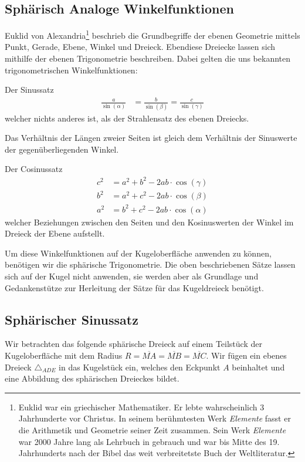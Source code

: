 \begin{refsection}
\section{Sphärisch Analoge Winkelfunktionen}
Euklid von Alexandria\footnote{%
Euklid war ein griechischer Mathematiker. Er lebte wahrscheinlich 3 Jahrhunderte vor Christus. In seinem berühmtesten Werk \textit{Elemente} fasst er die Arithmetik und Geometrie seiner Zeit zusammen. Sein Werk \textit{Elemente} war 2000 Jahre lang als Lehrbuch in gebrauch und war bis Mitte des 19. Jahrhunderts nach der Bibel das weit verbreitetste Buch der Weltliteratur.}  beschrieb die Grundbegriffe der ebenen Geometrie mittels Punkt, Gerade, Ebene, Winkel und Dreieck. Ebendiese Dreiecke lassen sich mithilfe der ebenen Trigonometrie beschreiben. Dabei gelten die uns bekannten trigonometrischen Winkelfunktionen:

Der Sinussatz
\begin{align*}
\frac{ a }{\sin(\alpha) } &= \frac{ b }{\sin(\beta)} = \frac{ c }{\sin(\gamma)}
\end{align*}
welcher nichts anderes ist, als der Strahlensatz des ebenen Dreiecks. 

\begin{definition}
Das Verhältnis der Längen zweier Seiten ist gleich dem Verhältnis der Sinuswerte der gegenüberliegenden Winkel.
\end{definition}

Der Cosinussatz
\begin{align*}
c^{ 2 } &= a^{ 2 } + b^{ 2 } - 2ab\cdot \cos(\gamma)\\
b^{ 2 } &= a^{ 2 } + c^{ 2 } - 2ab\cdot \cos(\beta)\\
a^{ 2 } &= b^{ 2 } + c^{ 2 } - 2ab\cdot \cos(\alpha)
\end{align*}
welcher Beziehungen zwischen den Seiten und den Kosinuswerten der Winkel im Dreieck der Ebene aufstellt.

Um diese Winkelfunktionen auf der Kugeloberfläche anwenden zu können, benötigen wir die sphärische Trigonometrie. Die oben beschriebenen Sätze lassen sich auf der Kugel nicht anwenden, sie werden aber als Grundlage und Gedankenstütze zur Herleitung der Sätze für das Kugeldreieck benötigt.


\subsection{Sphärischer Sinussatz}
Wir betrachten das folgende sphärische Dreieck auf einem Teilstück der Kugeloberfläche mit dem Radius $R= \overline{MA} = \overline{MB} = \overline{MC}$. Wir fügen ein ebenes Dreieck $\triangle_{ADE}$ in das Kugelstück ein, welches den Eckpunkt $A$ beinhaltet und eine Abbildung des sphärischen Dreieckes bildet.


\end{refsection}
